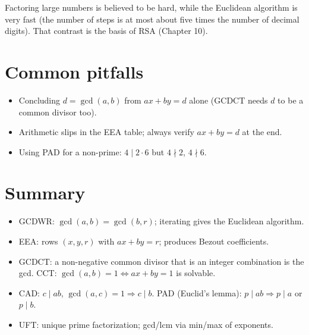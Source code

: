 \begin{aside}
Factoring large numbers is believed to be hard, while the Euclidean algorithm is very fast
(the number of steps is at most about five times the number of decimal digits). That contrast
is the basis of RSA (Chapter 10).
\end{aside}

\section{Common pitfalls}
\begin{itemize}
  \item Concluding $d = \gcd(a,b)$ from $ax + by = d$ alone (GCDCT needs $d$ to be a common
        divisor too).
  \item Arithmetic slips in the EEA table; always verify $ax + by = d$ at the end.
  \item Using PAD for a non-prime: $4 \mid 2\cdot 6$ but $4\nmid 2$, $4 \nmid 6$.
\end{itemize}

\section{Summary}
\begin{itemize}
  \item GCDWR: $\gcd(a,b) = \gcd(b,r)$; iterating gives the Euclidean algorithm.
  \item EEA: rows $(x,y,r)$ with $ax + by = r$; produces Bezout coefficients.
  \item GCDCT: a non-negative common divisor that is an integer combination is the gcd.
        CCT: $\gcd(a,b) = 1 \iff ax+by = 1$ is solvable.
  \item CAD: $c\mid ab$, $\gcd(a,c) = 1 \Rightarrow c \mid b$. PAD (Euclid's lemma): $p \mid ab
        \Rightarrow p\mid a$ or $p \mid b$.
  \item UFT: unique prime factorization; gcd/lcm via min/max of exponents.
\end{itemize}
